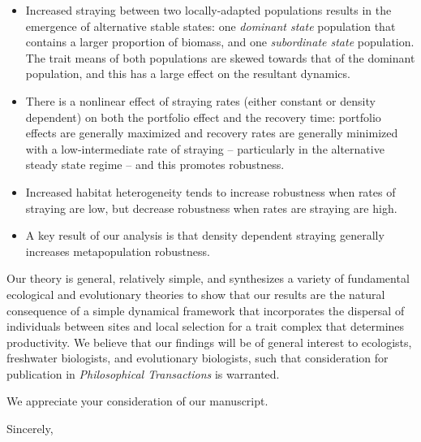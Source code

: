 \documentclass[ucm,12pt]{ucletter}
\begin{document}
\begin{letter}
\begin{itemize}
  \item Increased straying between two locally-adapted populations results in the emergence of alternative stable states: one \emph{dominant state} population that contains a larger proportion of biomass, and one \emph{subordinate state} population.
  The trait means of both populations are skewed towards that of the dominant population, and this has a large effect on the resultant dynamics.
  \item There is a nonlinear effect of straying rates (either constant or density dependent) on both the portfolio effect and the recovery time: portfolio effects are generally maximized and recovery rates are generally minimized with a low-intermediate rate of straying -- particularly in the alternative steady state regime -- and this promotes robustness.
  \item Increased habitat heterogeneity tends to increase robustness when rates of straying are low, but decrease robustness when rates are straying are high. 
  \item A key result of our analysis is that density dependent straying generally increases metapopulation robustness.
\end{itemize}


Our theory is general, relatively simple, and synthesizes a variety of fundamental ecological and evolutionary theories to show that our results are the natural consequence of a simple dynamical framework that incorporates the dispersal of individuals between sites and local selection for a trait complex that determines productivity. 
We believe that our findings will be of general interest to ecologists, freshwater biologists, and evolutionary biologists, such that consideration for publication in \emph{Philosophical Transactions} is warranted.

We appreciate your consideration of our manuscript.


\vspace{5mm}

\singlespacing
\closing{Sincerely,\\
\\
}

\end{letter}
\end{document}
